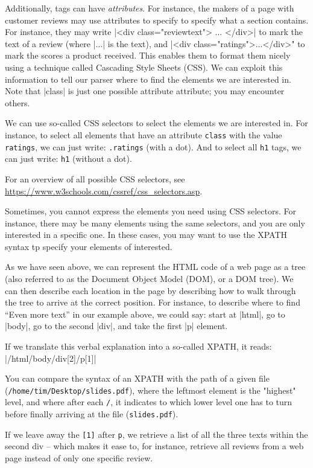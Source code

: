 Additionally, tags can have \emph{attributes}. For instance, the
makers of a page with customer reviews may use attributes to specify
to specify what a section contains. For instance, they may write |<div
class="reviewtext"> ... </div>| to mark the text of a review (where
|...| is the text), and |<div class="ratings">...</div>" to mark the
scores a product received. This enables them to format them nicely
using a technique called Cascading Style Sheets (CSS). We can exploit
this information to tell our parser where to find the elements we
are interested in. Note that |class| is just one possible attribute
attribute; you may encounter others.


We can use so-called CSS selectors to select the elements we are
interested in.  For instance, to select all elements that have an
attribute \texttt{class} with the value \texttt{ratings}, we can just
write: \texttt{.ratings} (with a dot).  And to select all \texttt{h1}
tags, we can just write: \texttt{h1} (without a dot).

For an overview of all possible CSS selectors, see
\url{https://www.w3schools.com/cssref/css_selectors.asp}.

Sometimes, you cannot express the elements you need using CSS
selectors. For instance, there may be many elements using the same
selectors, and you are only interested in a specific one. In these
cases, you may want to use the XPATH syntax tp specify your elements
of interested.

As we have seen above, we can represent the HTML code of a web page as
a tree (also referred to as the Document Object Model (DOM), or a DOM
tree). We can then describe each location in the page by describing
how to walk through the tree to arrive at the correct position.  For
instance, to describe where to find ``Even more text'' in our example
above, we could say: start at |html|, go to |body|, go to the second |div|,
and take the first |p| element.

If we translate this verbal explanation into a so-called XPATH, it reads:
|/html/body/div[2]/p[1]|


 You can compare the syntax of an XPATH with the path of a given file
 (\texttt{/home/tim/Desktop/slides.pdf}), where the leftmost element
 is the "highest" level, and where after each \texttt{/}, it indicates
 to which lower level one has to turn before finally arriving at the
 file (\texttt{slides.pdf}).

If we leave away the \texttt{[1]} after \texttt{p}, we retrieve a list
of all the three texts within the second div -- which makes it ease
to, for instance, retrieve all reviews from a web page instead of only
one specific review.

